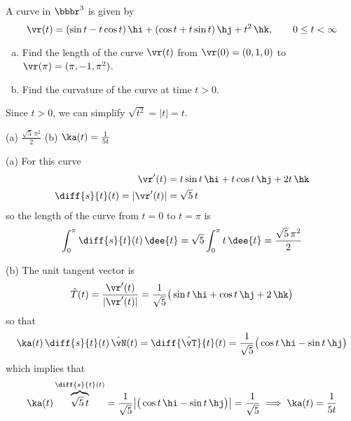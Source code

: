 \begin{question}[M317 2016D] %
A curve in $\bbbr^3$ is given by
\begin{equation*}
\vr(t) = (\sin t - t \cos t)\,\hi + (\cos t + t \sin t)\,\hj + t^2\,\hk,
\qquad
0 \le t < \infty
\end{equation*}
\begin{enumerate}[(a)]
\item
Find the length of the curve $\vr(t)$ from $\vr(0) = (0, 1, 0)$ to 
$\vr(\pi) = (\pi, -1, \pi^2)$.
\item
Find the curvature of the curve at time $t > 0$.
\end{enumerate}
\end{question}

\begin{hint} 
Since $t>0$, we can simplify $\sqrt{t^2}=|t|=t$.
\end{hint}

\begin{answer} 
(a) $\frac{\sqrt{5}\,\pi^2}{2}$\qquad
(b) $\ka(t) = \frac{1}{5t}$
\end{answer}

\begin{solution} (a) For this curve
\begin{align*}
\vr'(t) &= t\sin t\,\hi + t\cos t\,\hj +2t\,\hk \\
\diff{s}{t}(t)=|\vr'(t)| &= \sqrt{5} \,t
\end{align*}
so the length of the curve from $t=0$ to $t=\pi$ is
\begin{align*}
\int_0^\pi \diff{s}{t}(t)\, \dee{t}
=\sqrt{5} \int_0^\pi t\, \dee{t}
=\frac{\sqrt{5}\,\pi^2}{2}
\end{align*}

(b) The unit tangent vector is
\begin{equation*}
\hat T(t) = \frac{\vr'(t)}{|\vr'(t)|} 
     = \frac{1}{\sqrt{5}}\big(\sin t\,\hi + \cos t\,\hj +2\,\hk\big)
\end{equation*}
so that
\begin{align*}
\ka(t)\,\diff{s}{t}(t)\,\hat\vN(t) = \diff{\hat\vT}{t}(t)
=\frac{1}{\sqrt{5}}\big(\cos t\,\hi - \sin t\,\hj \big)
\end{align*}
which implies that
\begin{align*}
\ka(t)\overbrace{\sqrt{5}\, t}^{\diff{s}{t}(t)}
=\frac{1}{\sqrt{5}}\big|\big(\cos t\,\hi - \sin t\,\hj \big)\big|
=\frac{1}{\sqrt{5}}
\implies  \ka(t) = \frac{1}{5t}
\end{align*}
\end{solution}




